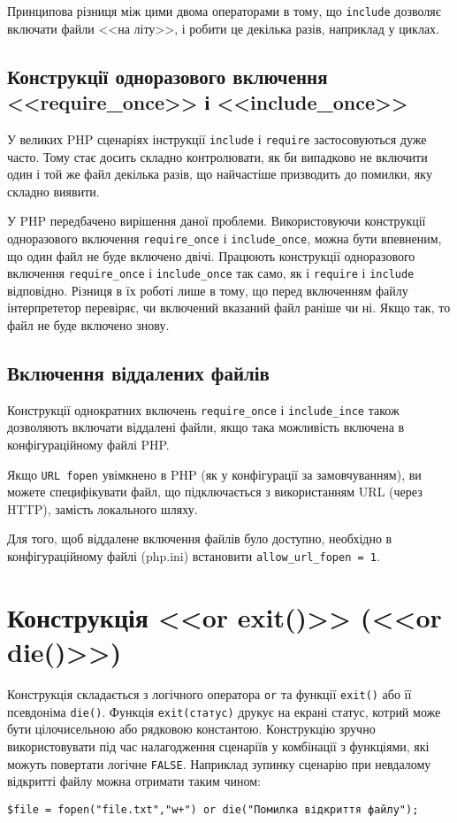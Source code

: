 Принципова різниця між цими двома операторами в тому, що \verb'include' дозволяє включати файли <<на літу>>, і робити це декілька разів, наприклад у циклах.
\subsection*{Конструкції одноразового включення <<require\_once>> і <<include\_once>>}
 
У великих PHP сценаріях інструкції \verb'include' і \verb'require' застосовуються дуже часто. Тому стає досить складно контролювати, як би випадково не включити один і той же файл декілька разів, що найчастіше призводить до помилки, яку складно виявити.

У PHP передбачено вирішення даної проблеми. Використовуючи конструкції одноразового включення \verb'require_once' і \verb'include_once', можна бути впевненим, що один файл не буде включено двічі. Працюють конструкції одноразового включення \verb'require_once' і \verb'include_once' так само, як і \verb'require' і \verb'include' відповідно. Різниця в їх роботі лише в тому, що перед включенням файлу інтерпрететор перевіряє, чи включений вказаний файл раніше чи ні. Якщо так, то файл не буде включено знову. 

\subsection*{Включення віддалених файлів}

Конструкції однократних включень \verb'require_once' і \verb'include_ince' також дозволяють включати віддалені файли, якщо така можливість включена в конфігураційному файлі PHP.

Якщо \verb'URL fopen' увімкнено в PHP (як у конфігурації за замовчуванням), ви можете специфікувати файл, що підключається з використанням URL (через HTTP), замість локального шляху. 

Для того, щоб віддалене включення файлів було доступно, необхідно в конфігураційному файлі (php.ini) встановити \verb'allow_url_fopen = 1'.


\pagebreak[3]

\section{Конструкція <<or exit()>> (<<or die()>>)}
Конструкція складається з логічного оператора \verb'or' та функції \verb'exit()' або її псевдоніма \verb'die()'. Функція \verb'exit(статус)' друкує на екрані статус, котрий може бути цілочисельною або рядковою константою. Конструкцію зручно використовувати під час налагодження сценаріїв у комбінації з функціями, які можуть повертати логічне \verb'FALSE'. Наприклад зупинку сценарію при невдалому відкритті файлу можна отримати таким чином:
\begin{verbatim}
$file = fopen("file.txt","w+") or die("Помилка відкриття файлу");
\end{verbatim} 



